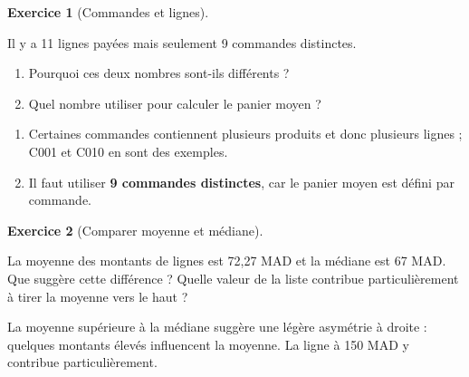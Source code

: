 \documentclass[
  french,
  letterpaper,
  open=any]{scrbook}
\providecommand{\tightlist}{%
  \setlength{\itemsep}{0pt}\setlength{\parskip}{0pt}}
\theoremstyle{definition}
\theoremstyle{definition}
\newtheorem{exercise}{Exercice}[section]
\theoremstyle{remark}
\begin{document}
\begin{exercise}[Commandes et
lignes]\protect\hypertarget{exr-cas-5}{}\label{exr-cas-5}

Il y a 11 lignes payées mais seulement 9 commandes distinctes.

\begin{enumerate}
\def\labelenumi{\alph{enumi}.}
\tightlist
\item
  Pourquoi ces deux nombres sont-ils différents ?
\item
  Quel nombre utiliser pour calculer le panier moyen ?
\end{enumerate}

\end{exercise}

\begin{tcolorbox}[enhanced jigsaw, arc=.35mm, bottomrule=.15mm, bottomtitle=1mm, breakable, colback=white, colbacktitle=quarto-callout-tip-color!10!white, colframe=quarto-callout-tip-color-frame, coltitle=black, left=2mm, leftrule=.75mm, opacityback=0, opacitybacktitle=0.6, rightrule=.15mm, title=\textcolor{quarto-callout-tip-color}{\faLightbulb}\hspace{0.5em}{Solution de l'exercice Exercice~\ref{exr-cas-5}}, titlerule=0mm, toprule=.15mm, toptitle=1mm]

\begin{enumerate}
\def\labelenumi{\alph{enumi}.}
\tightlist
\item
  Certaines commandes contiennent plusieurs produits et donc plusieurs
  lignes ; C001 et C010 en sont des exemples.
\item
  Il faut utiliser \textbf{9 commandes distinctes}, car le panier moyen
  est défini par commande.
\end{enumerate}

\end{tcolorbox}

\begin{exercise}[Comparer moyenne et
médiane]\protect\hypertarget{exr-cas-6}{}\label{exr-cas-6}

La moyenne des montants de lignes est 72,27 MAD et la médiane est 67
MAD. Que suggère cette différence ? Quelle valeur de la liste contribue
particulièrement à tirer la moyenne vers le haut ?

\end{exercise}

\begin{tcolorbox}[enhanced jigsaw, arc=.35mm, bottomrule=.15mm, bottomtitle=1mm, breakable, colback=white, colbacktitle=quarto-callout-tip-color!10!white, colframe=quarto-callout-tip-color-frame, coltitle=black, left=2mm, leftrule=.75mm, opacityback=0, opacitybacktitle=0.6, rightrule=.15mm, title=\textcolor{quarto-callout-tip-color}{\faLightbulb}\hspace{0.5em}{Solution de l'exercice Exercice~\ref{exr-cas-6}}, titlerule=0mm, toprule=.15mm, toptitle=1mm]

La moyenne supérieure à la médiane suggère une légère asymétrie à droite
: quelques montants élevés influencent la moyenne. La ligne à 150 MAD y
contribue particulièrement.

\end{tcolorbox}
\end{document}
